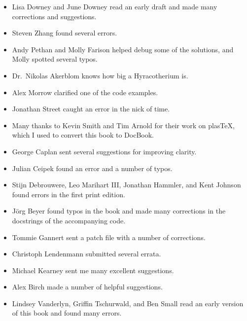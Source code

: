 \documentclass[12pt]{book}
\begin{document}
\begin{itemize}

\item Lisa Downey and June Downey read an early draft and made many
corrections and suggestions.

\item Steven Zhang found several errors.

\item Andy Pethan and Molly Farison helped debug some of the solutions,
and Molly spotted several typos.

\item Dr.\ Nikolas Akerblom knows how big a Hyracotherium is.

\item Alex Morrow clarified one of the code examples.

\item Jonathan Street caught an error in the nick of time.

\item Many thanks to Kevin Smith and Tim Arnold for their work on
plasTeX, which I used to convert this book to DocBook.

\item George Caplan sent several suggestions for improving clarity.

\item Julian Ceipek found an error and a number of typos.

\item Stijn Debrouwere, Leo Marihart III, Jonathan Hammler, and Kent Johnson
found errors in the first print edition.

\item J\"{o}rg Beyer found typos in the book and made many corrections
in the docstrings of the accompanying code.

\item Tommie Gannert sent a patch file with a number of corrections.

\item Christoph Lendenmann submitted several errata.

\item Michael Kearney sent me many excellent suggestions.

\item Alex Birch made a number of helpful suggestions.

\item Lindsey Vanderlyn, Griffin Tschurwald, and Ben Small read an
  early version of this book and found many errors.


\end{itemize}
\end{document}
